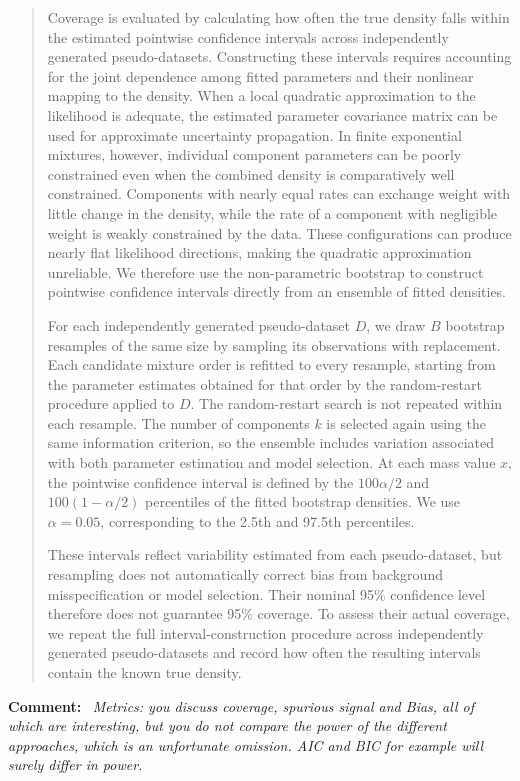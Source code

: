 \documentclass[11pt,a4paper]{article}
\newcommand{\refcomment}[1]{%
    \medskip\noindent\textbf{\color{refcolor}Comment:}\ %
    {\itshape #1}\par\smallskip
}
\newcommand{\addedtext}[1]{%
    \smallskip\begin{quote}\color{quotecolor}\small #1\end{quote}\smallskip
}
\begin{document}
\addedtext{Coverage is evaluated by calculating how often the true density falls within the estimated pointwise confidence intervals across independently generated pseudo-datasets. Constructing these intervals requires accounting for the joint dependence among fitted parameters and their nonlinear mapping to the density. When a local quadratic approximation to the likelihood is adequate, the estimated parameter covariance matrix can be used for approximate uncertainty propagation. In finite exponential mixtures, however, individual component parameters can be poorly constrained even when the combined density is comparatively well constrained. Components with nearly equal rates can exchange weight with little change in the density, while the rate of a component with negligible weight is weakly constrained by the data. These configurations can produce nearly flat likelihood directions, making the quadratic approximation unreliable. We therefore use the non-parametric bootstrap \cite{Efron_1986} to construct pointwise confidence intervals directly from an ensemble of fitted densities.

For each independently generated pseudo-dataset $D$, we draw $B$ bootstrap resamples of the same size by sampling its observations with replacement. Each candidate mixture order is refitted to every resample, starting from the parameter estimates obtained for that order by the random-restart procedure applied to $D$. The random-restart search is not repeated within each resample. The number of components $k$ is selected again using the same information criterion, so the ensemble includes variation associated with both parameter estimation and model selection. At each mass value $x$, the pointwise confidence interval is defined by the $100\alpha/2$ and $100(1-\alpha/2)$ percentiles of the fitted bootstrap densities. We use $\alpha=0.05$, corresponding to the 2.5th and 97.5th percentiles.

These intervals reflect variability estimated from each pseudo-dataset, but resampling does not automatically correct bias from background misspecification or model selection. Their nominal 95\% confidence level therefore does not guarantee 95\% coverage. To assess their actual coverage, we repeat the full interval-construction procedure across independently generated pseudo-datasets and record how often the resulting intervals contain the known true density.}

\refcomment{Metrics: you discuss coverage, spurious signal and Bias, all of which are
interesting, but you do not compare the power of the different approaches,
which is an unfortunate omission. AIC and BIC for example will surely differ
in power.}
\end{document}
